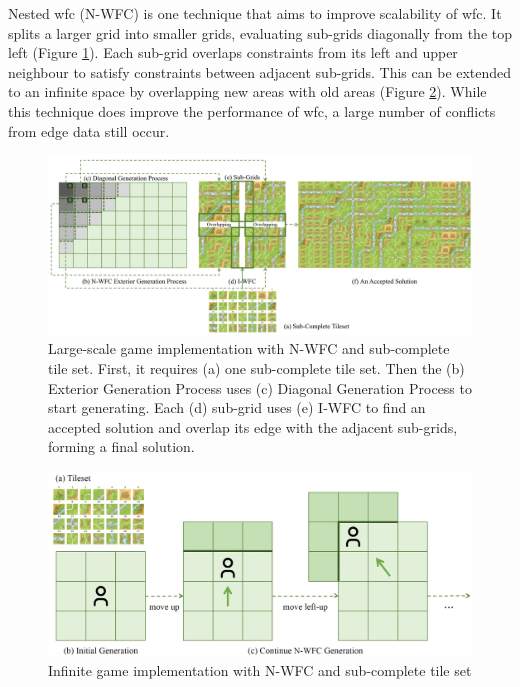 Nested \acrshort{wfc} (N-WFC) \cite{Nested_WFC} is one technique that aims to improve scalability of \acrshort{wfc}. It splits a larger grid into smaller grids, evaluating sub-grids diagonally from the top left (Figure \ref{fig:nestedWFC}). Each sub-grid overlaps constraints from its left and upper neighbour to satisfy constraints between adjacent sub-grids. This can be extended to an infinite space by overlapping new areas with old areas (Figure \ref{fig:infiniteWFC}). While this technique does improve the performance of \acrshort{wfc}, a large number of conflicts from edge data still occur.

\begin{figure}[H]
    \centering
    \includegraphics[width=\textwidth, height=0.3\textheight, keepaspectratio]{Images/NestedWFC.jpg}
    \caption{Large-scale game implementation with N-WFC and sub-complete tile set. First, it requires (a) one sub-complete tile set. Then the (b) Exterior Generation Process uses (c) Diagonal Generation Process to start generating. Each (d) sub-grid uses (e) I-WFC to find an accepted solution and overlap its edge with the adjacent sub-grids, forming a final solution. \cite{Nested_WFC}}
    \label{fig:nestedWFC}
\end{figure}

\begin{figure}[H]
    \centering
    \includegraphics[width=\textwidth, height=0.3\textheight, keepaspectratio]{Images/InfiniteWFC.jpg}
    \caption{Infinite game implementation with N-WFC and sub-complete tile set \cite{Nested_WFC}}
    \label{fig:infiniteWFC}
\end{figure}

